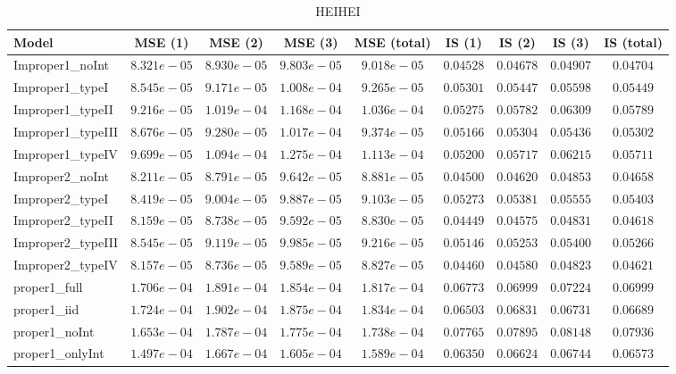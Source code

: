 \begin{table}

\caption{\label{tab:model-choice-sc1}HEIHEI}
\centering
\begin{tabular}{lcccccccc}
\hline
Model  & MSE (1) & MSE (2) & MSE (3) & MSE (total) & IS (1) & IS (2) & IS (3) & \multicolumn{1}{c}{IS (total)} \\ 
\hline
Improper1_noInt  & $8.321e-05$ & $8.930e-05$ & $9.803e-05$ & $9.018e-05$ & $0.04528$ & $0.04678$ & $0.04907$ & $0.04704$ \\
Improper1_typeI  & $8.545e-05$ & $9.171e-05$ & $1.008e-04$ & $9.265e-05$ & $0.05301$ & $0.05447$ & $0.05598$ & $0.05449$ \\
Improper1_typeII  & $9.216e-05$ & $1.019e-04$ & $1.168e-04$ & $1.036e-04$ & $0.05275$ & $0.05782$ & $0.06309$ & $0.05789$ \\
Improper1_typeIII  & $8.676e-05$ & $9.280e-05$ & $1.017e-04$ & $9.374e-05$ & $0.05166$ & $0.05304$ & $0.05436$ & $0.05302$ \\
Improper1_typeIV  & $9.699e-05$ & $1.094e-04$ & $1.275e-04$ & $1.113e-04$ & $0.05200$ & $0.05717$ & $0.06215$ & $0.05711$ \\
Improper2_noInt  & $8.211e-05$ & $8.791e-05$ & $9.642e-05$ & $8.881e-05$ & $0.04500$ & $0.04620$ & $0.04853$ & $0.04658$ \\
Improper2_typeI  & $8.419e-05$ & $9.004e-05$ & $9.887e-05$ & $9.103e-05$ & $0.05273$ & $0.05381$ & $0.05555$ & $0.05403$ \\
Improper2_typeII  & $8.159e-05$ & $8.738e-05$ & $9.592e-05$ & $8.830e-05$ & $0.04449$ & $0.04575$ & $0.04831$ & $0.04618$ \\
Improper2_typeIII  & $8.545e-05$ & $9.119e-05$ & $9.985e-05$ & $9.216e-05$ & $0.05146$ & $0.05253$ & $0.05400$ & $0.05266$ \\
Improper2_typeIV  & $8.157e-05$ & $8.736e-05$ & $9.589e-05$ & $8.827e-05$ & $0.04460$ & $0.04580$ & $0.04823$ & $0.04621$ \\
proper1_full  & $1.706e-04$ & $1.891e-04$ & $1.854e-04$ & $1.817e-04$ & $0.06773$ & $0.06999$ & $0.07224$ & $0.06999$ \\
proper1_iid  & $1.724e-04$ & $1.902e-04$ & $1.875e-04$ & $1.834e-04$ & $0.06503$ & $0.06831$ & $0.06731$ & $0.06689$ \\
proper1_noInt  & $1.653e-04$ & $1.787e-04$ & $1.775e-04$ & $1.738e-04$ & $0.07765$ & $0.07895$ & $0.08148$ & $0.07936$ \\
proper1_onlyInt  & $1.497e-04$ & $1.667e-04$ & $1.605e-04$ & $1.589e-04$ & $0.06350$ & $0.06624$ & $0.06744$ & $0.06573$ \\

\end{tabular}
\end{table}
